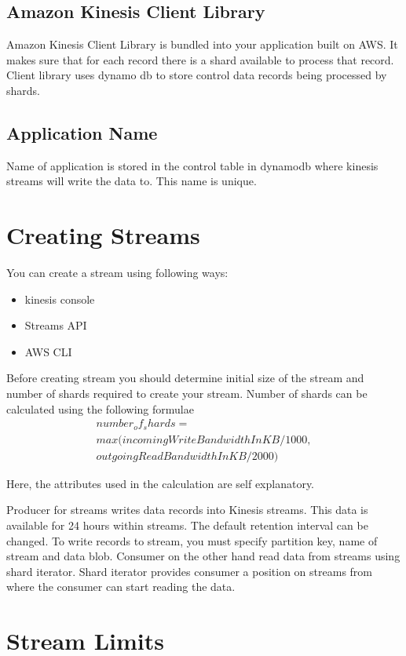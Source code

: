 \documentclass[9pt,twocolumn,twoside]{../../styles/osajnl}
\begin{document}
\subsection{Amazon Kinesis Client Library}
Amazon Kinesis Client Library is bundled into your application built on AWS. It
makes sure that for each record there is a shard available to process that
record.  Client library uses dynamo db to store control data records being
processed by shards.

\subsection{Application Name}
Name of application is stored in the control table in dynamodb where kinesis
streams will write the data to. This name is unique.

\section{Creating Streams}
You can create a stream using following ways:
\begin{itemize}
	\item kinesis console
	\item Streams API
	\item AWS CLI
\end{itemize}

Before creating stream you should determine initial size of the stream
\cite{www-kinesis-size} and number of shards required to create your stream.
Number of shards can be calculated using the following formulae
\begin{multline*} 
number_of_shards = \\
   max ( 
   incomingWriteBandwidthInKB/1000, \\
   outgoingReadBandwidthInKB/2000
   )
\end{multline*}

Here, the attributes used in the calculation are self explanatory.

Producer for streams writes data records into Kinesis streams. This data is
available for 24 hours within streams. The default retention interval can be
changed. To write records to stream, you must specify partition key, name of
stream and data blob. Consumer on the other hand read data from streams using
shard iterator. Shard iterator provides consumer a position on streams from
where the consumer can start reading the data.

\section{Stream Limits}
\end{document}
